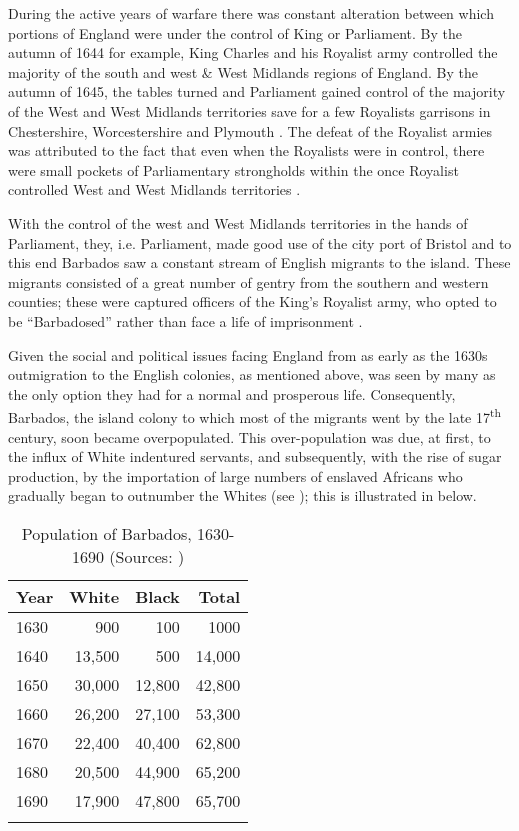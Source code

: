 During the active years of warfare there was constant alteration between which portions of England were under the control of King or Parliament. By the autumn of 1644 for example, King Charles and his Royalist army controlled the majority of the south and west \& West Midlands regions of England. By the autumn of 1645, the tables turned and Parliament gained control of the majority of the West and West Midlands territories save for a few Royalists garrisons in Chestershire, Worcestershire and Plymouth \citep{Gaunt03}. The defeat of the Royalist armies was attributed to the fact that even when the Royalists were in control, there were small pockets of Parliamentary strongholds within the once Royalist controlled West and West Midlands territories \citep{Gaunt03}.

With the control of the west and West Midlands territories in the hands of Parliament, they, i.e. Parliament, made good use of the city port of Bristol and to this end Barbados saw a constant stream of English migrants to the island. These migrants consisted of a great number of gentry from the southern and western counties; these were captured officers of the King's Royalist army, who opted to be {``Barbadosed''} rather than face a life of imprisonment \citep{Harlow26, Pugh57, Wheeler02, Manning06}.

Given the social and political issues facing England from as early as the 1630s outmigration to the English colonies, as mentioned above, was seen by many as the only option they had for a normal and prosperous life. Consequently, Barbados, the island colony to which most of the migrants went by the late 17\textsuperscript{th} century, soon became overpopulated. This over-population was due, at first, to the influx of White indentured servants, and subsequently, with the rise of sugar production, by the importation of large numbers of enslaved Africans \citep{James98} who gradually began to outnumber the Whites (see \citealt{Campbell77, Campbell84, Campbell93,  McCusker91, Galenson02}); this is illustrated in  below.

\begin{table}
\begin{tabular}{lrrr}
\lsptoprule 
{Year} & {White} & {Black} & {Total}\\
\midrule
1630 & 900 & 100 & 1000 \\
1640 & 13,500 & 500 & 14,000 \\
1650 & 30,000 & 12,800 & 42,800 \\
1660 & 26,200 & 27,100 & 53,300 \\
1670 & 22,400 & 40,400 & 62,800 \\
1680 & 20,500 & 44,900 & 65,200 \\
1690 & 17,900 & 47,800 & 65,700 \\
\lspbottomrule 
\end{tabular}
\caption{Population of Barbados, 1630-1690 (Sources: \citealt{Campbell77, Campbell84, McCusker91})\label{Table 6.1}}
\end{table}


